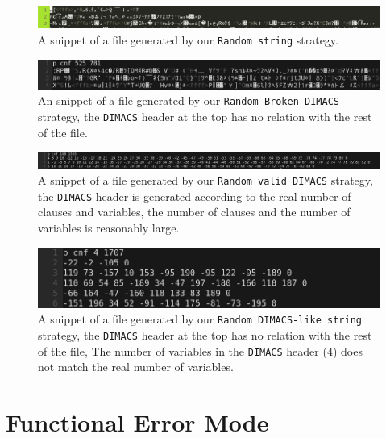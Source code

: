 \documentclass{article}
\begin{document}
\begin{figure}
	\centering
	\includegraphics[width=0.9\linewidth]{"random string"}
	\caption{A snippet of a file generated by our \texttt{Random string} strategy.}
	\label{fig:random-string}
\end{figure}

\begin{figure}
	\centering
	\includegraphics[width=0.8\linewidth]{"random broken dimacs"}
	\caption{An snippet of a file generated by our \texttt{Random Broken DIMACS} strategy, the \texttt{DIMACS} header at the top has no relation with the rest of the file.}
	\label{fig:random-broken-dimacs}
\end{figure}
\begin{figure}
	\centering
	\includegraphics[width=0.8\linewidth]{"random valid dimacs"}
	\caption{A snippet of a file generated by our \texttt{Random valid DIMACS} strategy, the \texttt{DIMACS} header is generated according to the real number of clauses and variables, the number of clauses and the number of variables is reasonably large.}
	\label{fig:random-dimacs}
\end{figure}
\begin{figure}
	\centering
	\includegraphics[width=0.8\linewidth]{"random semi dimacs"}
	\caption{A snippet of a file generated by our \texttt{Random DIMACS-like string} strategy, the \texttt{DIMACS} header at the top has no relation with the rest of the file, The number of variables in the \texttt{DIMACS} header (4) does not match the real number of variables.}
	\label{fig:random-dimacs-like}
\end{figure}


\section{Functional Error Mode}
\end{document}
